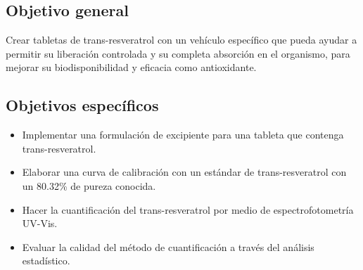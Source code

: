 \subsection{Objetivo general}
Crear tabletas de trans-resveratrol con un vehículo específico que pueda ayudar a permitir
 su liberación controlada y su completa absorción en el organismo, para mejorar
 su biodisponibilidad y eficacia como antioxidante.

\subsection{Objetivos específicos}
\begin{itemize}
    \item Implementar una formulación de excipiente para una tableta que contenga trans-resveratrol.
    \item Elaborar una curva de calibración con un estándar de trans-resveratrol con un \num{80.32}\% de
    pureza conocida.
    \item Hacer la cuantificación del trans-resveratrol por medio de espectrofotometría UV-Vis.
    \item Evaluar la calidad del método de cuantificación a través del análisis estadístico.
\end{itemize}